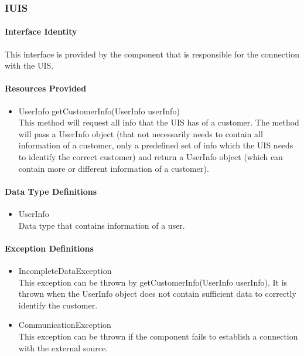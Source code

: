 \subsubsection{IUIS}
\paragraph{Interface Identity}
This interface is provided by the component that is responsible for the connection
	with the UIS.
\paragraph{Resources Provided}
\begin{itemize}
	\item{UserInfo getCustomerInfo(UserInfo userInfo)}\\
	This method will request all info that the UIS has of a customer. The method will
		pass a UserInfo object (that not necessarily needs to contain all information
		of a customer, only a predefined set of info which the UIS needs to identify
		the correct customer) and return a UserInfo object (which can contain more or
		different information of a customer).
\end{itemize}
\paragraph{Data Type Definitions}
\begin{itemize}
	\item UserInfo\\
	Data type that contains information of a user.
\end{itemize}
\paragraph{Exception Definitions}
\begin{itemize}
	\item IncompleteDataException\\
	This exception can be thrown by getCustomerInfo(UserInfo userInfo). It is thrown
		when the UserInfo object does not contain sufficient data to correctly identify
		the customer.
	\item CommunicationException\\
	This exception can be thrown if the component fails to establish a connection with
		the external source.
\end{itemize}
